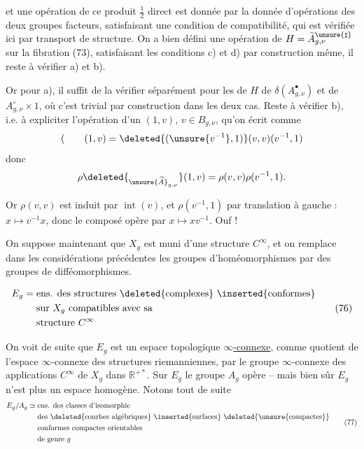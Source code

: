 
et une opération de ce produit \(\frac12\) direct est donnée  par  la donnée d'opérations des deux groupes facteurs, satisfaisant une condition de compatibilité, qui est vérifiée ici par transport de structure. On a bien défini une opération de \(H=\widetilde A_{g,\nu}^{\unsure{\sharp}}\) sur la fibration (73),  satisfaisant les conditions c) et d) par construction même, il reste à vérifier a) et b).

Or pour a), il suffit de la vérifier séparément pour les  de \(H\) de \(\delta(A_{g,\nu}^{\bullet})\) et de \(A_{g,\nu}^{\circ}\times 1\), où c'est trivial par construction dans les deux cas. Reste à vérifier b), i.e. à expliciter l'opération d'un  \((1,v)\), \(v\in B_{g,\nu}\), qu'on écrit comme
\[
 (\qquad (1,v)=\deleted{(\unsure{v^{-1}},1)}(v,v)(v^{-1},1)
\]
donc
\[
 \rho\deleted{_{\unsure{\widetilde A}_{g,\nu}}}(1,v)=\rho(v,v)\rho(v^{-1},1).
\]

Or \(\rho(v,v)\) est induit par \(\operatorname{int}(v)\),  et \(\rho(v^{-1},1)\) par translation à gauche : \(x\mapsto v^{-1}x\), donc le composé opère par \(x\mapsto xv^{-1}\). Ouf !


On suppose maintenant que \(X_g\) est muni d'une structure \(C^\infty\), et on remplace dans les considérations  précédentes les groupes d'homéomorphismes par des groupes de difféomorphismes.

\[
 \begin{aligned}
 E_g={}&\text{ens. des structures \deleted{complexes} \inserted{conformes}}\\
 &\text{sur }X_g\text{ compatibles avec sa}\\
 &\text{structure }C^\infty
 \end{aligned}
 \tag{76}
\]

 On voit de suite que \(E_g\) est un espace topologique \uline{\(\infty\)-connexe}, comme quotient de l'espace \(\infty\)-connexe  des structures riemanniennes, par le  groupe \(\infty\)-connexe des applications \(C^\infty\) de \(X_g\) dans \(\mathbb R^{+*}\). Sur \(E_g\) le groupe \(A_g\) opère -- mais bien sûr \(E_g\) n'est plus un espace homogène. Notons tout de suite
\[
 \begin{aligned}
 E_g/A_g\simeq{}&\text{ens. des classes d'isomorphie}\\
 &\text{des \deleted{courbes algébriques} \inserted{surfaces} \deleted{\unsure{compactes}}}\\
 &\text{conformes compactes orientables}\\
 &\text{de genre }g
 \end{aligned}
 \tag{77}
\]

